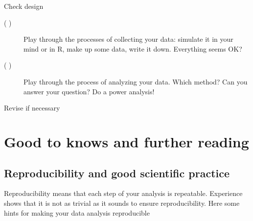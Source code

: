 \documentclass[a4paper,twoside]{tufte-book}\usepackage[]{graphicx}\usepackage[]{color}
\begin{document}
\begin{mdframed}
\begin{description}
\begin{description}
  \end{description}
  
\item[( )] Check design
  
  \begin{description}
  
  \item[( )] Play through the processes of collecting your data: simulate it in your mind or in R, make up some data, write it down. Everything seems OK?
  
  \item[( )] Play through the process of analyzing your data. Which method? Can you answer your question? Do a power analysis!

  \end{description}


\item[( )] Revise if necessary

\end{description}

\end{mdframed}


\chapter{Good to knows and further reading}

\section{Reproducibility and good scientific practice}

Reproducibility means that each step of your analysis is repeatable. Experience shows that it is not as trivial as it sounds to ensure reproducibility. Here some hints for making your data analysis reproducible
\end{document}
